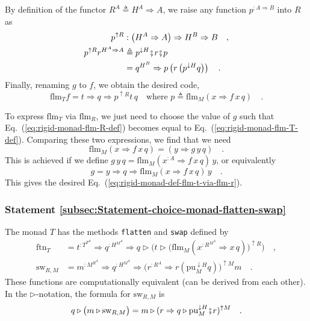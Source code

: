 By definition of the functor $R^{A}\triangleq H^{A}\Rightarrow A$,
we raise any function $p^{:A\Rightarrow B}$ into $R$ as 
\begin{align*}
p^{\uparrow R} & :\left(H^{A}\Rightarrow A\right)\Rightarrow H^{B}\Rightarrow B\quad,\\
p^{\uparrow R}r^{H^{A}\Rightarrow A} & \triangleq p^{\downarrow H}\bef r\bef p\\
 & =q^{H^{B}}\Rightarrow p\left(r\left(p^{\downarrow H}q\right)\right)\quad.
\end{align*}
Finally, renaming $g$ to $f$, we obtain the desired code,
\[
\text{flm}_{T}f=t\Rightarrow q\Rightarrow p^{\uparrow R}t\,q\quad\text{where }p\triangleq\text{flm}_{M}\left(x\Rightarrow f\,x\,q\right)\quad.
\]

To express $\text{flm}_{T}$ via $\text{flm}_{R}$, we just need to
choose the value of $g$ such that Eq.~(\ref{eq:rigid-monad-flm-R-def})
becomes equal to Eq.~(\ref{eq:rigid-monad-flm-T-def}). Comparing
these two expressions, we find that we need
\[
\text{flm}_{M}(x\Rightarrow f\,x\,q)=(y\Rightarrow g\,y\,q)\quad.
\]
This is achieved if we define $g\,y\,q=\text{flm}_{M}(x^{:A}\Rightarrow f\,x\,q)\,y$,
or equivalently 
\[
g=y\Rightarrow q\Rightarrow\text{flm}_{M}(x\Rightarrow f\,x\,q)\,y\quad.
\]
This gives the desired Eq.~(\ref{eq:rigid-monad-def-flm-t-via-flm-r}).

\subsubsection{Statement \label{subsec:Statement-choice-monad-flatten-swap}\ref{subsec:Statement-choice-monad-flatten-swap}}

The monad $T$ has the methods \lstinline!flatten!
and \lstinline!swap! defined
by
\begin{align}
\text{ftn}_{T} & =t^{:T^{T^{A}}}\Rightarrow q^{:H^{M^{A}}}\Rightarrow q\triangleright\bigg(t\triangleright\big(\text{flm}_{M}(x^{:R^{M^{A}}}\Rightarrow x\,q)\big)^{\uparrow R}\bigg)\quad,\label{eq:rigid-monad-def-of-ftn-t-via-forward}\\
\text{sw}_{R,M} & =m^{:M^{R^{A}}}\Rightarrow q^{:H^{M^{A}}}\Rightarrow\big(r^{:R^{A}}\Rightarrow r(\text{pu}_{M}^{\downarrow H}q)\big)^{\uparrow M}m\quad.\label{eq:rigid-monad-short-formula-for-swap}
\end{align}
These functions are computationally equivalent (can be derived from
each other). In the $\triangleright$-notation, the formula for $\text{sw}_{R,M}$
is
\begin{equation}
q\triangleright\big(m\triangleright\text{sw}_{R,M}\big)=m\triangleright(r\Rightarrow q\triangleright\text{pu}_{M}^{\downarrow H}\bef r)^{\uparrow M}\quad.\label{eq:rigid-monad-1-forward-formula-for-swap}
\end{equation}


